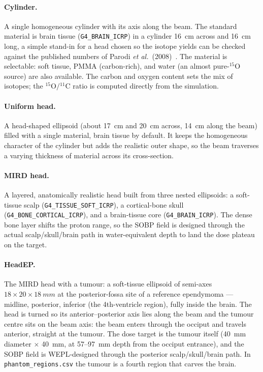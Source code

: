\documentclass[11pt]{article}
\newcommand{\Cl}[1]{{}^{#1}\mathrm{C}}
\newcommand{\Ox}[1]{{}^{#1}\mathrm{O}}
\newcommand{\file}[1]{\texttt{#1}}
\begin{document}
\paragraph{Cylinder.} A single homogeneous cylinder with its axis along the beam.
The standard material is brain tissue (\file{G4\_BRAIN\_ICRP}) in a cylinder
\SI{16}{cm} across and \SI{16}{cm} long, a simple stand-in for a head chosen so the
isotope yields can be checked against the published numbers of Parodi
\emph{et al.}\ (2008)~\cite{parodi2008comparison}. The material is selectable: soft
tissue, PMMA (carbon-rich), and water (an almost pure-$\Ox{15}$ source) are also
available. The carbon and oxygen content sets the mix of isotopes; the
$\Ox{15}/\Cl{11}$ ratio is computed directly from the simulation.

\paragraph{Uniform head.} A head-shaped ellipsoid (about \SI{17}{cm} and
\SI{20}{cm} across, \SI{14}{cm} along the beam) filled with a single material,
brain tissue by default. It keeps the homogeneous character of the cylinder but
adds the realistic outer shape, so the beam traverses a varying thickness of
material across its cross-section.

\paragraph{MIRD head.} A layered, anatomically realistic head built from three
nested ellipsoids: a soft-tissue scalp (\file{G4\_TISSUE\_SOFT\_ICRP}), a
cortical-bone skull (\file{G4\_BONE\_CORTICAL\_ICRP}), and a brain-tissue core
(\file{G4\_BRAIN\_ICRP}). The dense bone layer shifts the proton range, so the
SOBP field is designed through the actual scalp/skull/brain path in
water-equivalent depth to land the dose plateau on the target.

\paragraph{HeadEP.} The MIRD head with a tumour: a soft-tissue ellipsoid of
semi-axes $18\times20\times\SI{18}{mm}$ at the posterior-fossa site of a
reference ependymoma --- midline, posterior, inferior (the 4th-ventricle
region), fully inside the brain. The head is turned so its
anterior--posterior axis lies along the beam and the tumour centre sits on
the beam axis: the beam enters through the occiput and travels anterior,
straight at the tumour. The dose target is the tumour itself
(\SI{40}{mm} diameter $\times$ \SI{40}{mm}, at \SI{57}{}--\SI{97}{mm} depth
from the occiput entrance), and the SOBP field is WEPL-designed through the
posterior scalp/skull/brain path. In \file{phantom\_regions.csv} the tumour
is a fourth region that carves the brain.
\end{document}
